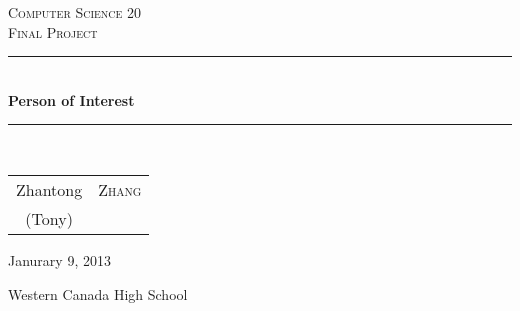 \newcommand{\HRule}{\rule{\linewidth}{0.5mm}}
\begin{titlepage}
\begin{center}
\textsc{\LARGE Computer Science 20}\\[1cm]
\textsc{\Large Final Project}\\[1cm]

\HRule \\[0.2cm]
{\huge\bfseries Person of Interest \\[0.2cm] }
\HRule \\[1cm]


\begin{tabular}{cc}
\Large Zhantong & \Large \textsc{Zhang}\\
(Tony) &
\end{tabular}

\vfill

{\large Janurary 9, 2013\par
Western Canada High School
}
\end{center}
\end{titlepage}